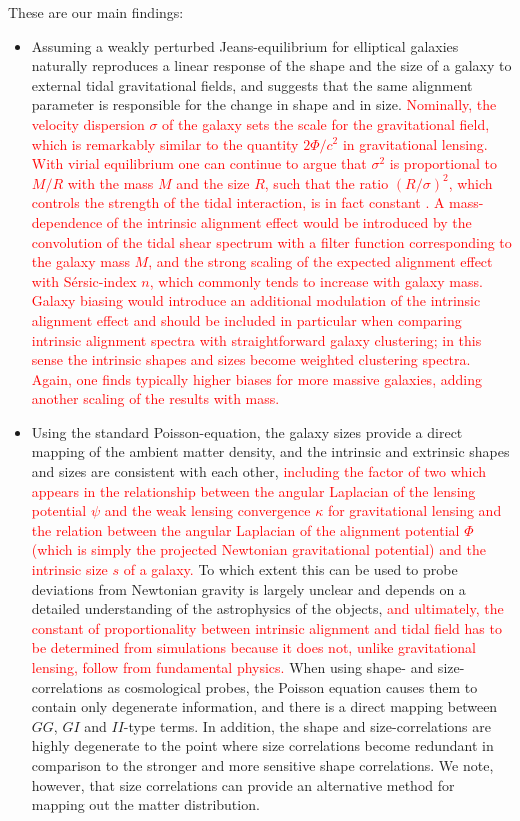 \documentclass[a4paper,fleqn,usenatbib]{mnras}
\newcommand\foca[1]{\textcolor{red}{#1}}
\begin{document}
These are our main findings:
\begin{itemize}
\item{Assuming a weakly perturbed Jeans-equilibrium for elliptical galaxies naturally reproduces a linear response of the shape and the size of a galaxy to external tidal gravitational fields, and suggests that the same alignment parameter is responsible for the change in shape and in size. \foca{Nominally, the velocity dispersion $\sigma$ of the galaxy sets the scale for the gravitational field, which is remarkably similar to the quantity $2\Phi/c^2$ in gravitational lensing. With virial equilibrium one can continue to argue that $\sigma^2$ is proportional to $M/R$ with the mass $M$ and the size $R$, such that the ratio $(R/\sigma)^2$, which controls the strength of the tidal interaction, is in fact constant \citep[compare][]{piras_mass_2018}. A mass-dependence of the intrinsic alignment effect would be introduced by the convolution of the tidal shear spectrum with a filter function corresponding to the galaxy mass $M$, and the strong scaling of the expected alignment effect with S{\'e}rsic-index $n$, which commonly tends to increase with galaxy mass. Galaxy biasing would introduce an additional modulation of the intrinsic alignment effect and should be included in particular when comparing intrinsic alignment spectra with straightforward galaxy clustering; in this sense the intrinsic shapes and sizes become weighted clustering spectra. Again, one finds typically higher biases for more massive galaxies, adding another scaling of the results with mass.}}

\item{Using the standard Poisson-equation, the galaxy sizes provide a direct mapping of the ambient matter density, and  the intrinsic and extrinsic shapes and sizes are consistent with each other, \foca{including the factor of two which appears in the relationship between the angular Laplacian of the lensing potential $\psi$ and the weak lensing convergence $\kappa$ for gravitational lensing and the relation between the angular Laplacian of the alignment potential $\Phi$ (which is simply the projected Newtonian gravitational potential) and the intrinsic size $s$ of a galaxy.} To which extent this can be used to probe deviations from Newtonian gravity is largely unclear and depends on a detailed understanding of the astrophysics of the objects, \foca{and ultimately, the constant of proportionality between intrinsic alignment and tidal field has to be determined from simulations because it does not, unlike gravitational lensing, follow from fundamental physics.} When using shape- and size-correlations as cosmological probes, the Poisson equation causes them to contain only degenerate information, and there is a direct mapping between $GG$, $GI$ and $II$-type terms. In addition, the shape and size-correlations are highly degenerate to the point where size correlations become redundant in comparison to the stronger and more sensitive shape correlations. We note, however, that size correlations can provide an alternative method for mapping out the matter distribution.}


\end{itemize}
\end{document}
